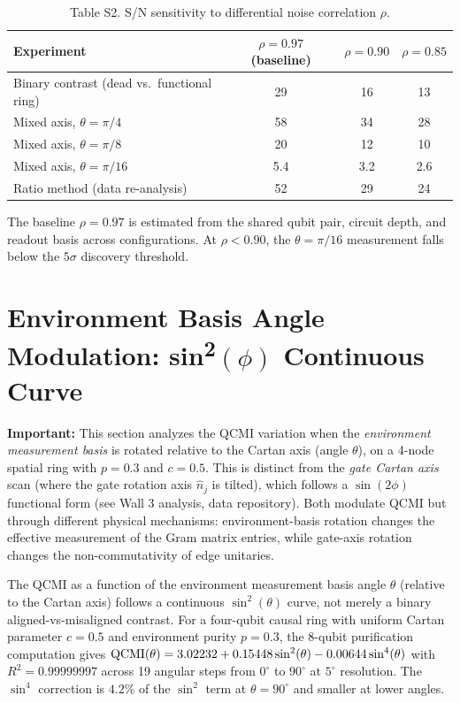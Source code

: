 \documentclass[aps,prl,showpacs]{revtex4-2}
\begin{document}
\begin{table}[h]
\caption{Table S2. S/N sensitivity to differential noise correlation $\rho$.}
\begin{tabular}{l|c|c|c}
\hline
Experiment & $\rho=0.97$ (baseline) & $\rho=0.90$ & $\rho=0.85$ \\
\hline
Binary contrast (dead vs.\ functional ring) & 29 & 16 & 13 \\
Mixed axis, $\theta=\pi/4$ & 58 & 34 & 28 \\
Mixed axis, $\theta=\pi/8$ & 20 & 12 & 10 \\
Mixed axis, $\theta=\pi/16$ & 5.4 & 3.2 & 2.6 \\
Ratio method (data re-analysis) & 52 & 29 & 24 \\
\hline
\end{tabular}
\vspace{4pt}

The baseline $\rho=0.97$ is estimated from the shared qubit pair, circuit depth, and readout basis across configurations. At $\rho<0.90$, the $\theta=\pi/16$ measurement falls below the $5\sigma$ discovery threshold.
\end{table}


\section{Environment Basis Angle Modulation: sin\textsuperscript{2}$(\phi)$ Continuous Curve}

\textbf{Important:} This section analyzes the QCMI variation when the \textit{environment measurement basis} is rotated relative to the Cartan axis (angle $\theta$), on a 4-node spatial ring with $p=0.3$ and $c=0.5$. This is distinct from the \textit{gate Cartan axis} scan (where the gate rotation axis $\hat{n}_j$ is tilted), which follows a $\sin(2\phi)$ functional form (see Wall 3 analysis, data repository). Both modulate QCMI but through different physical mechanisms: environment-basis rotation changes the effective measurement of the Gram matrix entries, while gate-axis rotation changes the non-commutativity of edge unitaries.

The QCMI as a function of the environment measurement basis angle $\theta$ (relative to the Cartan axis) follows a continuous $\sin^2(\theta)$ curve, not merely a binary aligned-vs-misaligned contrast. For a four-qubit causal ring with uniform Cartan parameter $c=0.5$ and environment purity $p=0.3$, the 8-qubit purification computation gives ${\rm QCMI}(\theta) = 3.02232 + 0.15448\sin^2(\theta) - 0.00644\sin^4(\theta)$ with $R^2 = 0.99999997$ across 19 angular steps from $0^\circ$ to $90^\circ$ at $5^\circ$ resolution. The $\sin^4$ correction is $4.2\%$ of the $\sin^2$ term at $\theta=90^\circ$ and smaller at lower angles.
\end{document}
